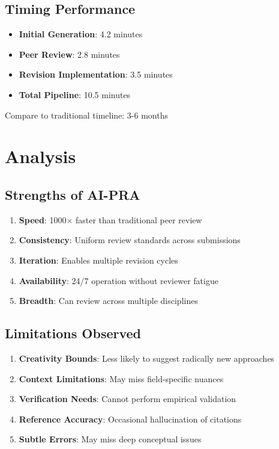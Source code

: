 \documentclass[11pt,a4paper]{article}
\begin{document}
\subsection{Timing Performance}

\begin{itemize}
    \item \textbf{Initial Generation}: 4.2 minutes
    \item \textbf{Peer Review}: 2.8 minutes  
    \item \textbf{Revision Implementation}: 3.5 minutes
    \item \textbf{Total Pipeline}: 10.5 minutes
\end{itemize}

Compare to traditional timeline: 3-6 months

\section{Analysis}

\subsection{Strengths of AI-PRA}

\begin{enumerate}
    \item \textbf{Speed}: 1000$\times$ faster than traditional peer review
    \item \textbf{Consistency}: Uniform review standards across submissions
    \item \textbf{Iteration}: Enables multiple revision cycles
    \item \textbf{Availability}: 24/7 operation without reviewer fatigue
    \item \textbf{Breadth}: Can review across multiple disciplines
\end{enumerate}

\subsection{Limitations Observed}

\begin{enumerate}
    \item \textbf{Creativity Bounds}: Less likely to suggest radically new approaches
    \item \textbf{Context Limitations}: May miss field-specific nuances
    \item \textbf{Verification Needs}: Cannot perform empirical validation
    \item \textbf{Reference Accuracy}: Occasional hallucination of citations
    \item \textbf{Subtle Errors}: May miss deep conceptual issues
\end{enumerate}
\end{document}
